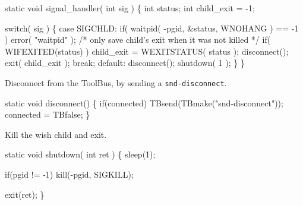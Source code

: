 \nwenddocs{}\endmoddef\let\nwnotused=\nwoutput{}\nwstartdeflinemarkup{}\nwenddeflinemarkup
static void signal_handler( int sig )
\{
   int status;
   int child_exit = -1;

   switch( sig )
   \{
      case SIGCHLD:
         if( waitpid( -pgid, &status, WNOHANG ) == -1 )
            error( "waitpid" );
         /* only save child's exit when it was not killed */
         if( WIFEXITED(status) )
            child_exit = WEXITSTATUS( status );
         disconnect();
         exit( child_exit );
         break;
      default:
         disconnect();
         shutdown( 1 );
   \}
\}
\nwendcode{}\nwdocspar


Disconnect from the ToolBus, by sending a {\tt snd-disconnect}.

\nwenddocs{}\endmoddef\let\nwnotused=\nwoutput{}\nwstartdeflinemarkup{}\nwenddeflinemarkup
static void disconnect()
\{
   if(connected)
      TBsend(TBmake("snd-disconnect"));
   connected = TBfalse;
\}
\nwendcode{}\nwdocspar


Kill the wish child and exit.

\nwenddocs{}\endmoddef\let\nwnotused=\nwoutput{}\nwstartdeflinemarkup{}\nwenddeflinemarkup
static void shutdown( int ret )
\{
   sleep(1);
   
   if(pgid != -1)
      kill(-pgid, SIGKILL);
   
   exit(ret);
\}
\nwendcode{}\nwdocspar



